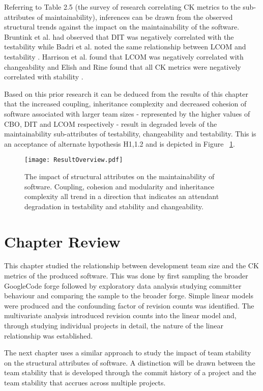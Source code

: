 Referring to Table 2.5 (the survey of research correlating CK metrics to the sub-attributes of maintainability), inferences can be drawn from the observed structural trends against the impact on the maintainability of the software. Bruntink et al. had observed that DIT was negatively correlated with the testability while Badri et al. noted the same relationship between LCOM and testability \citep{bruntink2006empirical, badri2011empirical}. Harrison et al. found that LCOM was negatively correlated with changeability and Elish and Rine found that all CK metrics were negatively correlated with stability \citep{harrison1998investigation, elish2003investigation}.

Based on this prior research it can be deduced from the results of this chapter that the increased coupling, inheritance complexity and decreased cohesion of software associated with larger team sizes - represented by the higher values of CBO, DIT and LCOM respectively - result in degraded levels of the maintainability sub-attributes of testability, changeability and testability. This is an acceptance of alternate hypothesis H1,1.2 and is depicted in Figure ~\ref{fig:ResultOverview}.

\begin{figure}[htbp!] 
\centering    
\texttt{[image: ResultOverview.pdf]}
\caption[The impact of internal attributes on the maintainability of software.]{The impact of structural attributes on the maintainability of software. Coupling, cohesion and modularity and inheritance complexity all trend in a direction that indicates an attendant degradation in testability and stability and changeability.}
\label{fig:ResultOverview}
\end{figure} 
  
 \section{Chapter Review} %
This chapter studied the relationship between development team size and the CK metrics of the produced software. This was done by first sampling the broader GoogleCode forge followed by exploratory data analysis studying committer behaviour and comparing the sample to the broader forge. Simple linear models were produced and the confounding factor of revision counts was identified. The multivariate analysis introduced revision counts into the linear model and, through studying individual projects in detail, the nature of the linear relationship was established.

The next chapter uses a similar approach to study the impact of team stability on the structural attributes of software. A distinction will be drawn between the team stability that is developed through the commit history of a project and the team stability that accrues across multiple projects.